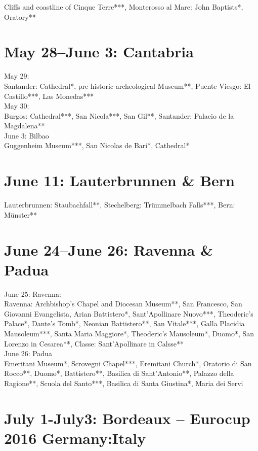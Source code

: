Cliffs and coastline of Cinque Terre***, Monterosso al Mare: John Baptists*, Oratory**

\section{May 28--June 3: Cantabria}
\label{Spain2016}

May 29:\\
Santander: Cathedral*, pre-historic archeological Museum**, Puente Viesgo: El Castillo***, Las Monedas***\\

May 30:\\
Burgos: Cathedral***, San Nicola***, San Gil**, Santander: Palacio de la Magdalena**\\

June 3: Bilbao\\
Guggenheim Museum***, San Nicolas de Bari*, Cathedral*

\section{June 11: Lauterbrunnen \& Bern}
\label{LauterbrunnenBern2016}

Lauterbrunnen: Staubachfall**, Stechelberg: Tr\"ummelbach Falls***, Bern: M\"unster**

\section{June 24--June 26: Ravenna \& Padua}
\label{RavennaPadua}

June 25: Ravenna:\\
Ravenna: Archbishop's Chapel and Diocesan Museum**, San Francesco, San Giovanni Evangelista, Arian Battistero*, Sant'Apollinare Nuovo***, Theoderic's Palace*, Dante's Tomb*, Neonian Battistero**, San Vitale***, Galla Placidia Mausoleum***, Santa Maria Maggiore*, Theoderic's Mausoleum*, Duomo*, San Lorenzo in Cesarea**, Classe: Sant'Apollinare in Calsse**\\

June 26: Padua\\
Emeritani Museum*, Scrovegni Chapel***, Eremitani Church*, Oratorio di San Rocco**, Duomo*, Battistero**, Basilica di Sant'Antonio**, Palazzo della Ragione**, Scuola del Santo***, Basilica di Santa Giustina*, Maria dei Servi

\section{July 1-July3: Bordeaux -- Eurocup 2016 Germany:Italy}
\label{2016:Bordeaux}

